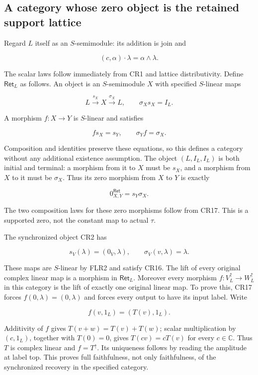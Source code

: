 \documentclass[11pt]{article}
\begin{document}
\subsection{A category whose zero object is the retained support lattice}

Regard \(L\) itself as an \(S\)-semimodule: its addition is join and

\[
(c,\alpha)\cdot\lambda=\alpha\wedge\lambda.
\tag{CR15}
\]

The scalar laws follow immediately from CR1 and lattice distributivity. Define \(\mathsf{Ret}_L\) as follows. An object is an \(S\)-semimodule \(X\) with specified \(S\)-linear maps

\[
L\xrightarrow{s_X}X\xrightarrow{\sigma_X}L,
\qquad \sigma_Xs_X=I_L.
\tag{CR16}
\]

A morphism \(f:X\to Y\) is \(S\)-linear and satisfies

\[
f s_X=s_Y,\qquad \sigma_Y f=\sigma_X.
\tag{CR17}
\]

Composition and identities preserve these equations, so this defines a category without any additional existence assumption. The object \((L,I_L,I_L)\) is both initial and terminal: a morphism from it to \(X\) must be \(s_X\), and a morphism from \(X\) to it must be \(\sigma_X\). Thus its zero morphism from \(X\) to \(Y\) is exactly

\[
0^{\mathsf{Ret}}_{X,Y}=s_Y\sigma_X.
\tag{CR18}
\]

The two composition laws for these zero morphisms follow from CR17. This is a supported zero, not the constant map to actual \(\tau\).

The synchronized object CR2 has

\[
s_V(\lambda)=(0_V,\lambda),\qquad
\sigma_V(v,\lambda)=\lambda.
\tag{CR19}
\]

These maps are \(S\)-linear by FLR2 and satisfy CR16. The lift of every original complex linear map is a morphism in \(\mathsf{Ret}_L\). Moreover every morphism \(f:V^\uparrow_L\to W^\uparrow_L\) in this category is the lift of exactly one original linear map. To prove this, CR17 forces \(f(0,\lambda)=(0,\lambda)\) and forces every output to have its input label. Write

\[
f(v,1_L)=(T(v),1_L).
\]

Additivity of \(f\) gives \(T(v+w)=T(v)+T(w)\); scalar multiplication by \((c,1_L)\), together with \(T(0)=0\), gives \(T(cv)=cT(v)\) for every \(c\in\mathbb C\). Thus \(T\) is complex linear and \(f=T^\uparrow\). Its uniqueness follows by reading the amplitude at label top. This proves full faithfulness, not only faithfulness, of the synchronized recovery in the specified category.
\end{document}
